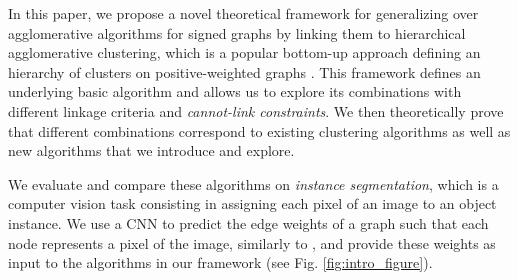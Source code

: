 
In this paper, we propose a novel theoretical framework for generalizing over agglomerative algorithms for signed graphs by linking them to hierarchical agglomerative clustering, which is a popular bottom-up approach defining an hierarchy of clusters on positive-weighted graphs \cite{lance1967general}. This framework defines an underlying basic algorithm and allows us to explore its combinations with different linkage criteria and \emph{cannot-link constraints}. %
We then theoretically prove that different combinations correspond to existing clustering algorithms as well as new algorithms that we introduce and explore. %

We evaluate and compare these algorithms on \emph{instance segmentation}, which is a computer vision task consisting in assigning each pixel of an image to an object instance. %
We use a CNN to predict the edge weights of a graph such that each node represents a pixel of the image, similarly to \cite{liu2018affinity,lee2017superhuman,wolf2018mutex}, and provide these weights as input to the algorithms in our framework (see Fig. \ref{fig:intro_figure}). 

